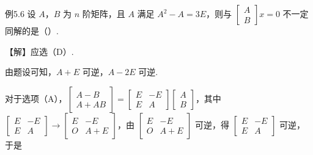 \begin{fcard}{例5.6}
设 $A$，$B$ 为 $n$ 阶矩阵，且 $A$ 满足 $A^{2}-A=3E$，则与 $\begin{bmatrix}A\\B\end{bmatrix}x=0$ 不一定同解的是（\quad）.


【解】应选（D）.

由题设可知，$A+E$ 可逆，$A-2E$ 可逆.

对于选项（A），$\begin{bmatrix}A-B\\A+AB\end{bmatrix}=\begin{bmatrix}E&-E\\E&A\end{bmatrix}\begin{bmatrix}A\\B\end{bmatrix}$，其中 $\begin{bmatrix}E&-E\\E&A\end{bmatrix}\to\begin{bmatrix}E&-E\\O&A+E\end{bmatrix}$，由 $\begin{bmatrix}E&-E\\O&A+E\end{bmatrix}$ 可逆，得 $\begin{bmatrix}E&-E\\E&A\end{bmatrix}$ 可逆，于是



\end{fcard}
